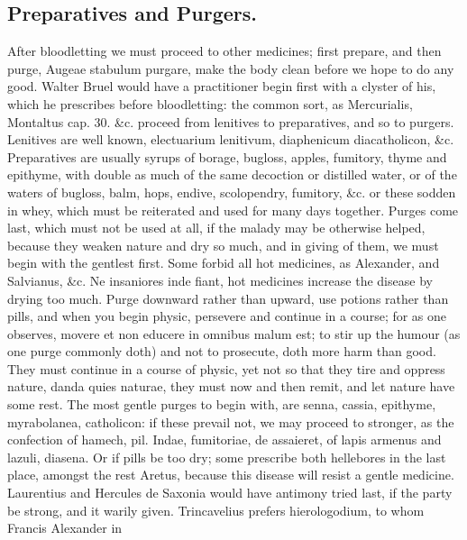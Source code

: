 \subsection{Preparatives and Purgers.}

After bloodletting we must proceed to other medicines; first prepare,
and then purge, Augeae stabulum purgare, make the body clean before we
hope to do any good. Walter Bruel would have a practitioner begin first
with a clyster of his, which he prescribes before bloodletting: the
common sort, as Mercurialis, Montaltus cap. 30. \&c. proceed from
lenitives to preparatives, and so to purgers. Lenitives are well known,
electuarium lenitivum, diaphenicum diacatholicon, \&c. Preparatives are
usually syrups of borage, bugloss, apples, fumitory, thyme and
epithyme, with double as much of the same decoction or distilled water,
or of the waters of bugloss, balm, hops, endive, scolopendry, fumitory,
\&c. or these sodden in whey, which must be reiterated and used for many
days together. Purges come last, which must not be used at all, if the
malady may be otherwise helped, because they weaken nature and dry so
much, and in giving of them,  we must begin with the gentlest
first. Some forbid all hot medicines, as Alexander, and Salvianus, \&c.
Ne insaniores inde fiant, hot medicines increase the disease by
drying too much. Purge downward rather than upward, use potions rather
than pills, and when you begin physic, persevere and continue in a
course; for as one observes, movere et non educere in omnibus
malum est; to stir up the humour (as one purge commonly doth) and not
to prosecute, doth more harm than good. They must continue in a course
of physic, yet not so that they tire and oppress nature, danda quies
naturae, they must now and then remit, and let nature have some rest.
The most gentle purges to begin with, are senna, cassia,
epithyme, myrabolanea, catholicon: if these prevail not, we may proceed
to stronger, as the confection of hamech, pil. Indae, fumitoriae, de
assaieret, of lapis armenus and lazuli, diasena. Or if pills be too
dry; some prescribe both hellebores in the last place, amongst
the rest Aretus, because this disease will resist a gentle
medicine. Laurentius and Hercules de Saxonia would have antimony tried
last, if the party be strong, and it warily given.
Trincavelius prefers hierologodium, to whom Francis Alexander in
